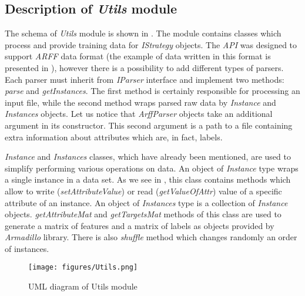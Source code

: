 \subsection{Description of \textit{Utils} module}

The schema of \textit{Utils} module is shown in . The module contains classes which process and provide training data for \textit{IStrategy} objects. The \textit{API} was designed to support \textit{ARFF} data format (the example of data written in this format is presented in ), however there is a possibility to add different types of parsers. Each parser must inherit from \textit{IParser} interface and implement two methods: \textit{parse} and \textit{getInstances}. The first method is certainly responsible for processing an input file, while the second method wraps parsed raw data by \textit{Instance} and \textit{Instances} objects. Let us notice that \textit{ArffParser} objects take an additional argument in its constructor. This second argument is a path to a file containing extra information about attributes which are, in fact, labels.

\textit{Instance} and \textit{Instances} classes, which have already been mentioned, are used to simplify performing various operations on data. An object of \textit{Instance} type wraps a single instance in a data set. As we see in , this class contains methods which allow to write (\textit{setAttributeValue}) or read (\textit{getValueOfAttr}) value of a specific attribute of an instance. An object of \textit{Instances} type is a collection of \textit{Instance} objects. \textit{getAttributeMat} and \textit{getTargetsMat} methods of this class are used to generate a matrix of features and a matrix of labels as objects provided by \textit{Armadillo} library. There is also \textit{shuffle} method which changes randomly an order of instances.  

\begin{figure}
\centering
\caption{UML diagram of Utils module}
\label{fig:utils_sh}
\texttt{[image: figures/Utils.png]}
\end{figure}

